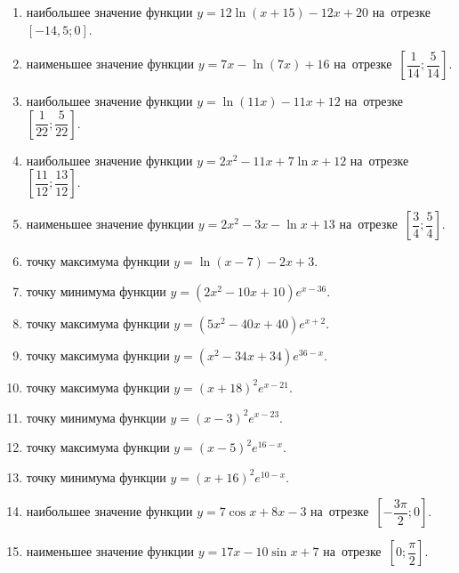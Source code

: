 \documentclass[a4paper,10pt]{article}
\begin{document}
\begin{enumerate}
\item {} наибольшее значение функции $y = 12\ln \left(x+15\right)-12x +20$ на~отрезке~$\left[-14,5;0\right]$.

\item {} наименьшее значение функции $y = 7x-\ln \left(7x\right)+16$ на~отрезке~$\left[\dfrac{1}{14};\dfrac{5}{14}\right]$.

\item {} наибольшее значение функции $y = \ln \left(11x\right)-11x+12$ на~отрезке~$\left[\dfrac{1}{22};\dfrac{5}{22}\right]$.

\item {} наибольшее значение функции $y=2x^2-11x+7\ln x+12$ на~отрезке~$\left[\dfrac{11}{12};\dfrac{13}{12}\right]$.

\item {} наименьшее значение функции $y=2x^2-3x-\ln x+13$ на~отрезке~$\left[\dfrac{3}{4};\dfrac{5}{4}\right]$.

\item {} точку максимума функции $y=\ln \left(x-7\right)-2x+3$.

\item {} точку минимума функции $y=\left(2x^2-10x+10\right)e^{x-36}$.

\item {} точку максимума функции $y=\left(5x^2-40x+40\right)e^{x+2}$.

\item {} точку максимума функции $y=\left(x^2-34x+34\right)e^{36-x}$.

\item {} точку максимума функции $y=\left(x +18\right)^2e^{x-21}$.

\item {} точку минимума функции $y=\left(x -3\right)^2e^{x-23}$.

\item {} точку максимума функции $y=\left(x -5\right)^2e^{16-x}$.

\item {} точку минимума функции $y=\left(x +16\right)^2e^{10-x}$.

\item {} наибольшее значение функции $y=7\cos x+8x -3$ на~отрезке~$\left[-\dfrac{3\pi }{2};0\right]$.

\item {} наименьшее значение функции $y=17x-10\sin x +7$ на~отрезке~$\left[0;\dfrac{\pi }{2}\right]$.


\end{enumerate}
\end{document}
